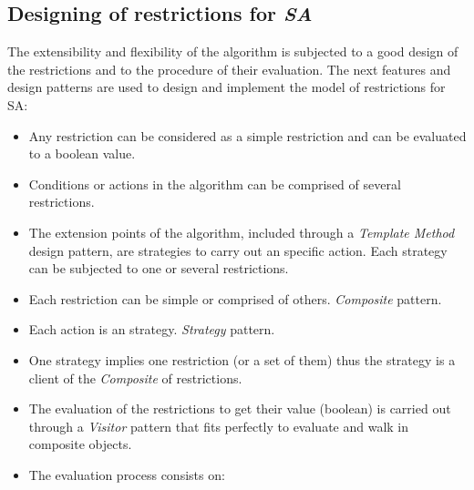 \documentclass{llncs}
\begin{document}
\subsection{Designing of restrictions for \textit{SA}}
The extensibility and flexibility of the algorithm is subjected to a good design
of the restrictions and to the procedure of their evaluation. 
The next features and design patterns are used to design and implement the model of restrictions for SA:
\begin{itemize}
  \item Any restriction can be considered as a simple restriction and can be
evaluated to a boolean value.
  \item Conditions or actions in the algorithm can be comprised of several
restrictions.
  \item The extension points of  the algorithm, included through a
\textit{Template Method} design pattern, are strategies to carry out an specific
action. Each strategy can be subjected to one or several restrictions.
\item Each restriction can be simple or comprised of others.
\textit{Composite} pattern.
  \item Each action is an strategy. \textit{Strategy} pattern.
  \item One strategy implies one restriction (or a set of them) thus the strategy
is a client of the \textit{Composite} of restrictions.
  \item The evaluation of the restrictions to get their value (boolean) is
carried out   through a \textit{Visitor} pattern that fits perfectly to evaluate and walk in
composite objects.
  \item The evaluation process consists on:

\end{itemize}
\end{document}
